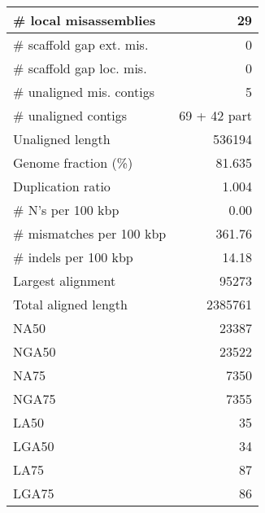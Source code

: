 \documentclass[12pt,a4paper]{article}
\begin{document}
\begin{table}[ht]
\begin{center}
\begin{tabular}{|l*{1}{|r}|}
\# local misassemblies & 29 \\ \hline
\# scaffold gap ext. mis. & 0 \\ \hline
\# scaffold gap loc. mis. & 0 \\ \hline
\# unaligned mis. contigs & 5 \\ \hline
\# unaligned contigs & 69 + 42 part \\ \hline
Unaligned length & 536194 \\ \hline
Genome fraction (\%) & 81.635 \\ \hline
Duplication ratio & 1.004 \\ \hline
\# N's per 100 kbp & 0.00 \\ \hline
\# mismatches per 100 kbp & 361.76 \\ \hline
\# indels per 100 kbp & 14.18 \\ \hline
Largest alignment & 95273 \\ \hline
Total aligned length & 2385761 \\ \hline
NA50 & 23387 \\ \hline
NGA50 & 23522 \\ \hline
NA75 & 7350 \\ \hline
NGA75 & 7355 \\ \hline
LA50 & 35 \\ \hline
LGA50 & 34 \\ \hline
LA75 & 87 \\ \hline
LGA75 & 86 \\ \hline
\end{tabular}
\end{center}
\end{table}
\end{document}
